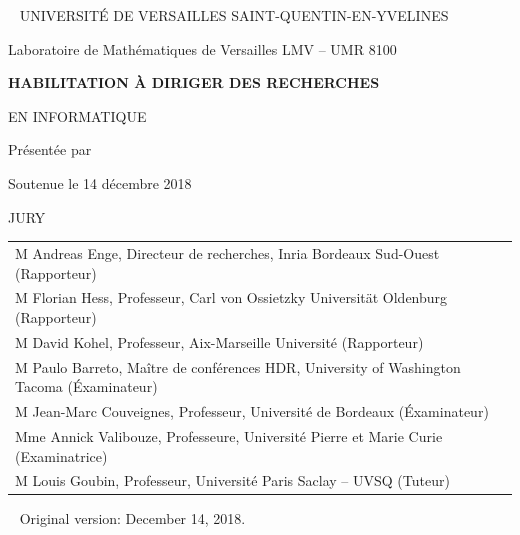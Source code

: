\begin{titlingpage}
  \begin{center}
    ~\vfill
    \Large{\MakeUppercase{Université de Versailles Saint-Quentin-en-Yvelines}}
    \par\vspace{\onelineskip}
    \Large{Laboratoire de Mathématiques de Versailles LMV -- UMR 8100}
    \par\vspace{3\onelineskip}
    \LARGE{\bf\MakeUppercase{Habilitation à diriger des recherches}}
    \par\vspace{\onelineskip}
    \Large{\MakeUppercase{en Informatique}}
    \par\vspace{2\onelineskip}
    \large{Présentée par}
    \par\vspace{0.5\onelineskip}
    \huge{\bf\MakeUppercase{\theauthor}}
    \par\vspace{2\onelineskip}
    \Huge{\bf\MakeUppercase{\thetitle}}
    \par\vspace{3\onelineskip}
    \large{Soutenue le 14 décembre 2018}
    \par\vfill
    \large\MakeUppercase{Jury}
    \par\vspace{\onelineskip}
    \begin{tabular}{l}
      M Andreas Enge, Directeur de recherches, Inria Bordeaux Sud-Ouest (Rapporteur)\\
      M Florian Hess, Professeur, Carl von Ossietzky Universität Oldenburg (Rapporteur)\\
      M David Kohel, Professeur, Aix-Marseille Université (Rapporteur)\\
      M Paulo Barreto, Maître de conférences HDR, University of Washington Tacoma (Éxaminateur)\\
      M Jean-Marc Couveignes, Professeur, Université de Bordeaux (Éxaminateur)\\
      Mme Annick Valibouze, Professeure, Université Pierre et Marie Curie (Examinatrice)\\
      M Louis Goubin, Professeur, Université Paris Saclay -- UVSQ (Tuteur)
    \end{tabular}
    \vfill
  \end{center}
  
  \clearpage

  ~\vfill
  \footnotesize
  Original version: December 14, 2018.%
  

\end{titlingpage}
